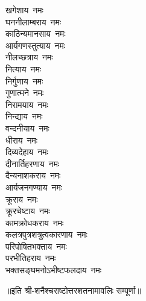 \begin{flushleft}
\begin{multicols}{2}
खगेशाय~नमः\\
घननीलाम्बराय~नमः\\
काठिन्यमानसाय~नमः\\
आर्यगणस्तुत्याय~नमः\\
नीलच्छत्राय~नमः\hfill{}\\
नित्याय~नमः\\
निर्गुणाय~नमः\\
गुणात्मने~नमः\\
निरामयाय~नमः\\
निन्द्याय~नमः\\
वन्दनीयाय~नमः\\
धीराय~नमः\\
दिव्यदेहाय~नमः\\
दीनार्तिहरणाय~नमः\\
दैन्यनाशकराय~नमः\hfill{}\\
आर्यजनगण्याय~नमः\\
क्रूराय~नमः\\
क्रूरचेष्टाय~नमः\\
कामक्रोधकराय~नमः\\
कलत्रपुत्रशत्रुत्वकारणाय~नमः\\
परिपोषितभक्ताय~नमः\\
परभीतिहराय~नमः\\
भक्तसङ्घमनोऽभीष्टफलदाय~नमः\\
\end{multicols}
\end{flushleft}
॥इति श्री-शनैश्चराष्टोत्तरशतनामावलिः सम्पूर्णा॥
